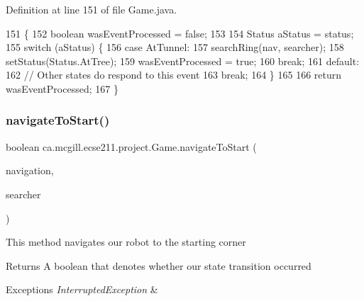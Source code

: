 Definition at line 151 of file Game.\+java.


\begin{DoxyCode}
151                                                                                   \{
152     \textcolor{keywordtype}{boolean} wasEventProcessed = \textcolor{keyword}{false};
153 
154     Status aStatus = status;
155     \textcolor{keywordflow}{switch} (aStatus) \{
156       \textcolor{keywordflow}{case} AtTunnel:
157         searchRing(nav, searcher);
158         setStatus(Status.AtTree);
159         wasEventProcessed = \textcolor{keyword}{true};
160         \textcolor{keywordflow}{break};
161       \textcolor{keywordflow}{default}:
162         \textcolor{comment}{// Other states do respond to this event}
163         \textcolor{keywordflow}{break};
164     \}
165 
166     \textcolor{keywordflow}{return} wasEventProcessed;
167   \}
\end{DoxyCode}
\mbox{\label{enumca_1_1mcgill_1_1ecse211_1_1project_1_1_game_aa9d873f6cd4ef177c1622c24f72b0e0a}} 
\subsubsection{\texorpdfstring{navigate\+To\+Start()}{navigateToStart()}}
{\footnotesize\ttfamily boolean ca.\+mcgill.\+ecse211.\+project.\+Game.\+navigate\+To\+Start (\begin{DoxyParamCaption}\item[{\hyperlink{classca_1_1mcgill_1_1ecse211_1_1project_1_1_navigation}{Navigation}}]{navigation,  }\item[{\hyperlink{classca_1_1mcgill_1_1ecse211_1_1project_1_1_ring_searcher}{Ring\+Searcher}}]{searcher }\end{DoxyParamCaption})}

This method navigates our robot to the starting corner

\begin{DoxyReturn}{Returns}
A boolean that denotes whether our state transition occurred 
\end{DoxyReturn}

\begin{DoxyExceptions}{Exceptions}
{\em Interrupted\+Exception} & \\
\hline
\end{DoxyExceptions}


